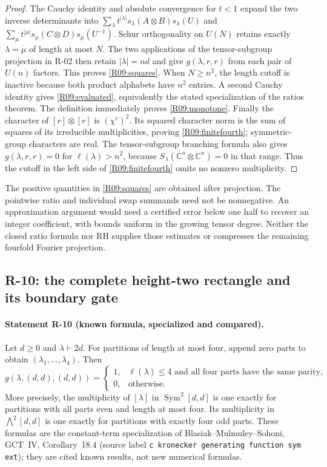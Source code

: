 \documentclass[11pt,a4paper]{article}
\theoremstyle{definition}\newtheorem{definition}{Definition}
\begin{document}
\begin{proof}
The Cauchy identity and absolute convergence for $t<1$ expand the two
inverse determinants into
$\sum_\lambda t^{|\lambda|}s_\lambda(A\otimes B)s_\lambda(U)$
and
$\sum_\mu t^{|\mu|}s_\mu(C\otimes D)s_\mu(U^{-1})$.
Schur orthogonality on $U(N)$ retains exactly $\lambda=\mu$ of
length at most $N$. The two applications of the tensor-subgroup
projection in R-02 then retain $|\lambda|=nd$ and give
$g(\lambda,r,r)$ from each pair of $U(n)$ factors. This proves
\eqref{R09:squares}. When $N\geq n^2$, the length cutoff is
inactive because both product alphabets have $n^2$ entries. A second
Cauchy identity gives \eqref{R09:evaluated}, equivalently the stated
specialization of the ratios theorem. The definition immediately
proves \eqref{R09:monotone}. Finally the character of
$[r]\otimes[r]$ is $(\chi^r)^2$. Its squared character norm is
the sum of squares of its irreducible multiplicities, proving
\eqref{R09:finitefourth}; symmetric-group characters are real.
The tensor-subgroup branching formula also gives
$g(\lambda,r,r)=0$ for $\ell(\lambda)>n^2$, because
$S_\lambda(\mathbb C^n\otimes\mathbb C^n)=0$ in that range.
Thus the cutoff in the left side of \eqref{R09:finitefourth}
omits no nonzero multiplicity.
\end{proof}

The positive quantities in \eqref{R09:squares} are obtained after
projection. The pointwise ratio and individual swap summands need
not be nonnegative. An approximation argument would need a
certified error below one half to recover an integer coefficient,
with bounds uniform in the growing tensor degree. Neither the
closed ratio formula nor RH supplies those estimates or compresses
the remaining fourfold Fourier projection.

\subsection{R-10: the complete height-two rectangle and its boundary gate}

\paragraph{Statement R-10 (known formula, specialized and compared).}
Let $d\geq0$ and $\lambda\vdash2d$. For partitions of length at
most four, append zero parts to obtain $(\lambda_1,\ldots,\lambda_4)$.
Then
\begin{equation}\label{R10:rectangle}
g(\lambda,(d,d),(d,d))=
\begin{cases}
1,&\ell(\lambda)\leq4\text{ and all four parts have the same parity},\\
0,&\text{otherwise}.
\end{cases}
\end{equation}
More precisely, the multiplicity of $[\lambda]$ in
$\operatorname{Sym}^2[d,d]$ is one exactly for partitions with all
parts even and length at most four. Its multiplicity in
$\bigwedge^2[d,d]$ is one exactly for partitions with exactly four
odd parts. These formulas are the constant-term specialization of
Blasiak--Mulmuley--Sohoni, GCT~IV, Corollary~18.4
(source label \nolinkurl{c kronecker generating function sym ext});
they are cited known results, not new numerical formulas.
\end{document}
